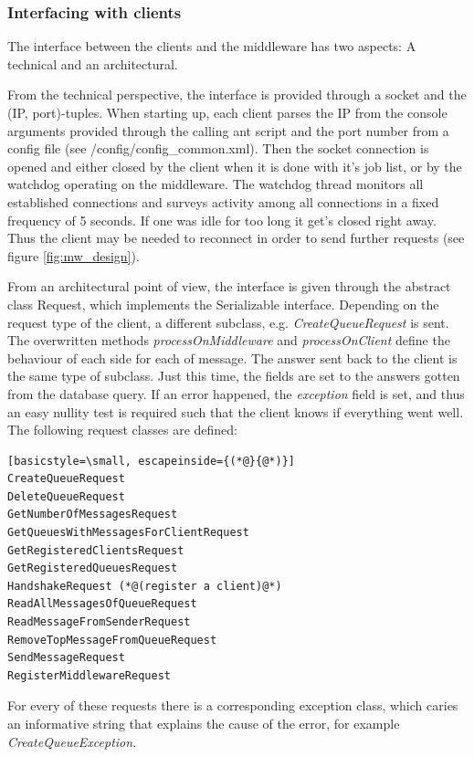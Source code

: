\documentclass[11pt]{article}
\begin{document}
\subsubsection{Interfacing with clients}\label{sec:interfacing-with-clients}
The interface between the clients and the middleware has two aspects: A technical and an architectural.

From the technical perspective, the interface is provided through a socket and the (IP, port)-tuples. When starting up, each client parses the IP from the console arguments provided through the calling ant script and the port number from a config file (see /config/config\_common.xml). Then the socket connection is opened and either closed by the client when it is done with it's job list, or by the watchdog operating on the middleware. The watchdog thread monitors all established connections and surveys activity among all connections in a fixed frequency of 5 seconds. If one was idle for too long it get's closed right away. Thus the client may be needed to reconnect in order to send further requests (see figure \ref{fig:mw_design}).

From an architectural point of view, the interface is given through the abstract class Request, which implements the Serializable interface. Depending on the request type of the client, a different subclass, e.g. \textit{CreateQueueRequest} is sent. The overwritten methods \textit{processOnMiddleware} and \textit{processOnClient} define the behaviour of each side for each of message. The answer sent back to the client is the same type of subclass. Just this time, the fields are set to the answers gotten from the database query. If an error happened, the \textit{exception} field is set, and thus an easy nullity test is required such that the client knows if everything went well.
The following request classes are defined:
\begin{lstlisting}[basicstyle=\small, escapeinside={(*@}{@*)}]
CreateQueueRequest
DeleteQueueRequest
GetNumberOfMessagesRequest
GetQueuesWithMessagesForClientRequest
GetRegisteredClientsRequest
GetRegisteredQueuesRequest
HandshakeRequest (*@(register a client)@*)
ReadAllMessagesOfQueueRequest
ReadMessageFromSenderRequest
RemoveTopMessageFromQueueRequest
SendMessageRequest
RegisterMiddlewareRequest
\end{lstlisting}
For every of these requests there is a corresponding exception class, which caries an informative string that explains the cause of the error, for example \textit{CreateQueueException}.
\end{document}
